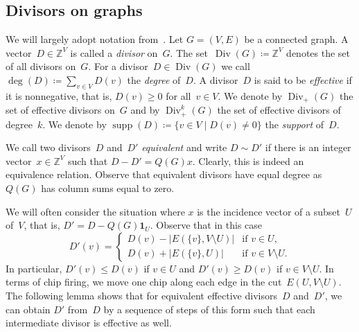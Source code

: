 \documentclass[ALCO,ThmDefs,Unicode,epreuves]{cedram}
\newcommand{\Z}{\ensuremath{\mathbb{Z}}}
\newcommand{\one}{\ensuremath{\mathbf{1}}}
\DeclareMathOperator{\Div}{Div}
\DeclareMathOperator{\supp}{supp}
\begin{document}
 
\subsection{Divisors on graphs}
We will largely adopt notation from~\cite{BakerNorine2007}. Let $G=(V,E)$ be a connected graph. A vector~$D\in \Z^V$ is called a \emph{divisor} on~$G$. The set~$\Div(G)\coloneqq \Z^V$ denotes the set of all divisors on~$G$. For a divisor~$D\in \Div(G)$ we call $\deg(D)\coloneqq \sum_{v\in V}D(v)$ the \emph{degree} of~$D$. A divisor~$D$ is said to be \emph{effective} if it is nonnegative, that is, $D(v)\geq 0$ for all~$v\in V$. We denote by $\Div_+(G)$ the set of effective divisors on~$G$ and by $\Div_+^k(G)$ the set of effective divisors of degree~$k$. We denote by $\supp(D)\coloneqq \{v\in V\mid D(v)\neq 0\}$ the \emph{support} of~$D$.

We call two divisors~$D$ and~$D'$ \emph{equivalent} and write $D\sim D'$ if there is an integer vector~$x\in \Z^V$ such that $D-D'=Q(G)x$. Clearly, this is indeed an equivalence relation. Observe that equivalent divisors have equal degree as $Q(G)$ has column sums equal to zero. 

We will often consider the situation where $x$ is the incidence vector of a subset~$U$ of~$V$, that is, $D'=D-Q(G)\one_U$. Observe that in this case 
\begin{equation}
D'(v)=\begin{cases}D(v)-|E(\{v\},V\setminus U)|&\text{if $v\in U$},\\D(v)+|E(\{v\},U)|&\text{if $v\in V\setminus U$.}\end{cases}
\end{equation}
In particular, $D'(v)\leq D(v)$ if $v\in U$ and $D'(v)\geq D(v)$ if $v\in V\setminus U$. In terms of chip firing, we move one chip along each edge in the cut~$E(U,V\setminus U)$. The following lemma shows that for equivalent effective divisors~$D$ and~$D'$, we can obtain $D'$ from~$D$ by a sequence of steps of this form such that each intermediate divisor is effective as well.
\end{document}
